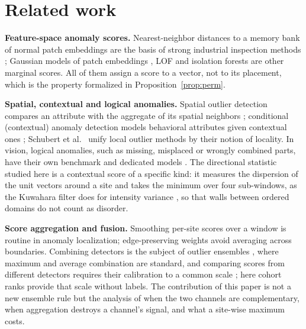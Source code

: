 \section{Related work}
\textbf{Feature-space anomaly scores.} Nearest-neighbor distances to a memory bank of normal patch embeddings are the basis of strong industrial inspection methods \citep{Roth2022}; Gaussian models of patch embeddings \citep{Defard2021}, LOF \citep{Breunig2000} and isolation forests \citep{Liu2008} are other marginal scores. All of them assign a score to a vector, not to its placement, which is the property formalized in Proposition~\ref{prop:perm}.

\textbf{Spatial, contextual and logical anomalies.} Spatial outlier detection compares an attribute with the aggregate of its spatial neighbors \citep{Shekhar2003}; conditional (contextual) anomaly detection models behavioral attributes given contextual ones \citep{Song2007}; Schubert et al.~\citep{Schubert2014} unify local outlier methods by their notion of locality. In vision, logical anomalies, such as missing, misplaced or wrongly combined parts, have their own benchmark \citep{Bergmann2022} and dedicated models \citep{Batzner2024}. The directional statistic studied here is a contextual score of a specific kind: it measures the dispersion of the unit vectors around a site \citep{Mardia2000,Banerjee2005} and takes the minimum over four sub-windows, as the Kuwahara filter does for intensity variance \citep{Kuwahara1976}, so that walls between ordered domains do not count as disorder.

\textbf{Score aggregation and fusion.} Smoothing per-site scores over a window is routine in anomaly localization; edge-preserving weights \citep{Tomasi1998} avoid averaging across boundaries. Combining detectors is the subject of outlier ensembles \citep{Aggarwal2015}, where maximum and average combination are standard, and comparing scores from different detectors requires their calibration to a common scale \citep{Kriegel2011}; here cohort ranks provide that scale without labels. The contribution of this paper is not a new ensemble rule but the analysis of when the two channels are complementary, when aggregation destroys a channel's signal, and what a site-wise maximum costs.
